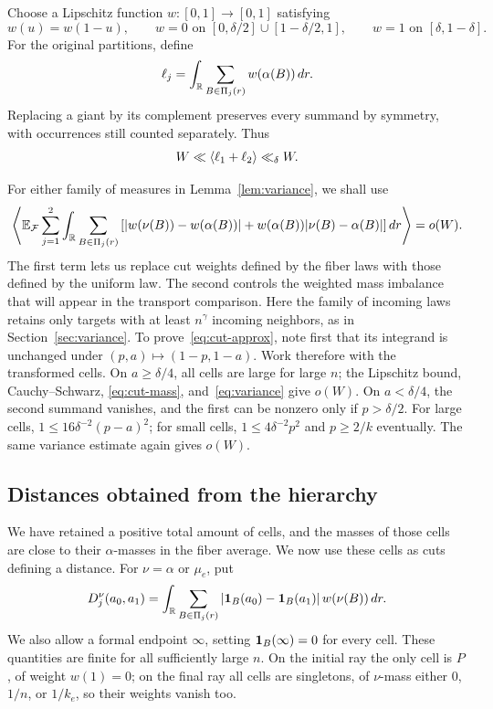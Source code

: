 Choose a Lipschitz function $w:[0,1]\to[0,1]$ satisfying
\[
 w(u)=w(1-u),\qquad
 w=0\text{ on }[0,\delta/2]\cup[1-\delta/2,1],\qquad
 w=1\text{ on }[\delta,1-\delta].
\]
For the original partitions, define
\[
 \ell_j=\int_{\mathbb R}\sum_{B\in\Pi_j(r)}w(\alpha(B))\,dr.
\]
Replacing a giant by its complement preserves every summand by
symmetry, with occurrences still counted separately. Thus
\begin{equation}\label{eq:unb-total-length}
 W\ll\left\langle \ell_1+\ell_2\right\rangle\ll_\delta W.
\end{equation}

For either family of measures in Lemma~\ref{lem:variance}, we shall use
\begin{equation}\label{eq:cut-approx}
 \left\langle \mathbb E_{\mathcal F}\sum_{j=1}^2\int_{\mathbb R}
 \sum_{B\in\Pi_j(r)}
 \left[|w(\nu(B))-w(\alpha(B))|
       +w(\alpha(B))|\nu(B)-\alpha(B)|\right]dr\right\rangle=o(W).
\end{equation}
The first term lets us replace cut weights defined by the fiber laws
with those defined by the uniform law.  The second controls the weighted
mass imbalance that will appear in the transport comparison.
Here the family of incoming laws retains only targets with at least
$n^\gamma$ incoming neighbors, as in Section~\ref{sec:variance}.
To prove~\eqref{eq:cut-approx}, note first that its integrand is
unchanged under $(p,a)\mapsto(1-p,1-a)$. Work therefore with the
transformed cells. On $a\ge\delta/4$, all cells are large for large
$n$; the Lipschitz bound, Cauchy--Schwarz,
\eqref{eq:cut-mass}, and~\eqref{eq:variance} give $o(W)$.
On $a<\delta/4$, the second summand vanishes, and the first can be
nonzero only if $p>\delta/2$. For large cells,
$1\le16\delta^{-2}(p-a)^2$; for small cells,
$1\le4\delta^{-2}p^2$ and $p\ge2/k$ eventually. The same variance
estimate again gives $o(W)$.

\subsection{Distances obtained from the hierarchy}

We have retained a positive total amount of cells, and the masses of
those cells are close to their $\alpha$-masses in the fiber average. We now use these cells as cuts defining a distance. For
$\nu=\alpha$ or $\mu_e$, put
\[
 D_j^\nu(a_0,a_1)=\int_{\mathbb R}\sum_{B\in\Pi_j(r)}
 |\mathbf 1_B(a_0)-\mathbf 1_B(a_1)|\,w(\nu(B))\,dr.
\]
We also allow a formal endpoint $\infty$, setting $\mathbf 1_B(\infty)=0$
for every cell. These quantities are finite for all sufficiently large
$n$. On the initial ray the only cell is $P$, of weight $w(1)=0$;
on the final ray all cells are singletons, of $\nu$-mass either
$0$, $1/n$, or $1/k_e$, so their weights vanish too.

